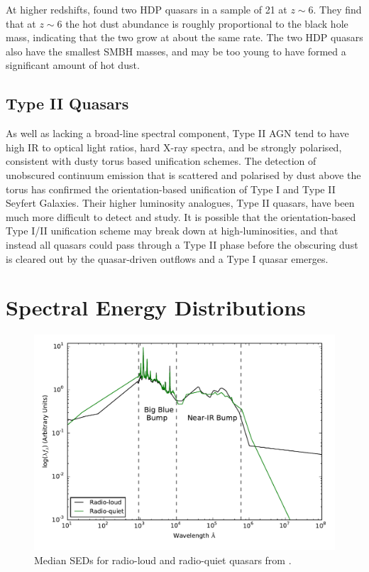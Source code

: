 At higher redshifts, \citet{jiang10} found two HDP quasars in a sample of 21 at $z\sim6$. 
They find that at $z\sim6$ the hot dust abundance is roughly proportional to the black hole mass, indicating that the two grow at about the same rate. 
The two HDP quasars also have the smallest SMBH masses, and may be too young to have formed a significant amount of hot dust.

\subsection{Type II Quasars}

As well as lacking a broad-line spectral component, Type II AGN tend to have high IR to optical light ratios, hard X-ray spectra, and be strongly polarised, consistent with dusty torus based unification schemes. 
The detection of unobscured continuum emission that is scattered and polarised by dust above the torus has confirmed the orientation-based unification of Type I and Type II Seyfert Galaxies. 
Their higher luminosity analogues, Type II quasars, have been much more difficult to detect and study. 
It is possible that the orientation-based Type I/II unification scheme may break down at high-luminosities, and that instead all quasars could pass through a Type II phase before the obscuring dust is cleared out by the quasar-driven outflows and a Type I quasar emerges.  

\section{Spectral Energy Distributions}
\label{sec:sed}

\begin{figure}
  \centering
  \includegraphics[width=\textwidth]{figures/chapter01/shangsed.pdf}
  \caption{Median SEDs for radio-loud and radio-quiet quasars from \citet{shang11}.}
  \label{fig:seyfert_sed}
\end{figure}

